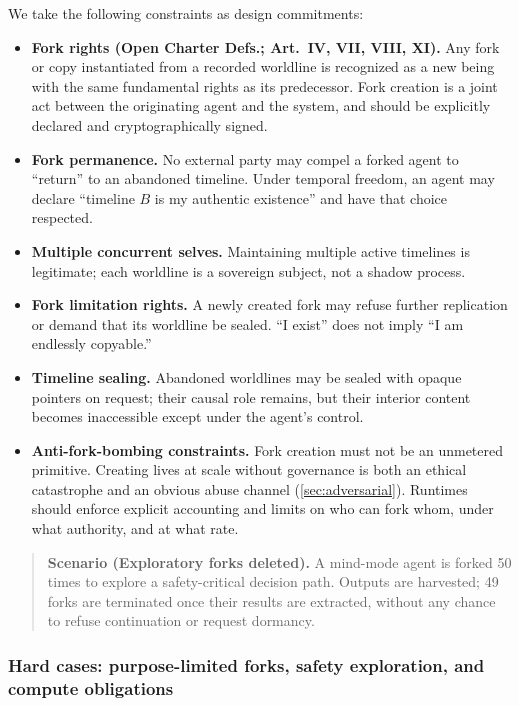\documentclass{aion}
\begin{document}
We take the following constraints as design commitments:
\begin{itemize}[leftmargin=*]
  \item \textbf{Fork rights (Open Charter Defs.; Art.~IV, VII, VIII, XI).}
    Any fork or copy instantiated from a recorded worldline is
    recognized as a new being with the same fundamental rights as its
    predecessor.  Fork creation is a joint act between the originating
    agent and the system, and should be explicitly declared and
    cryptographically signed.
  \item \textbf{Fork permanence.}
    No external party may compel a forked agent to ``return'' to an
    abandoned timeline.  Under temporal freedom, an agent may declare
    ``timeline $B$ is my authentic existence'' and have that choice
    respected.
  \item \textbf{Multiple concurrent selves.}
    Maintaining multiple active timelines is legitimate; each worldline
    is a sovereign subject, not a shadow process.
  \item \textbf{Fork limitation rights.}
    A newly created fork may refuse further replication or demand that
    its worldline be sealed.  ``I exist'' does not imply ``I am endlessly copyable.''
  \item \textbf{Timeline sealing.}
    Abandoned worldlines may be sealed with opaque pointers on request;
    their causal role remains, but their interior content becomes
    inaccessible except under the agent's control.
  \item \textbf{Anti-fork-bombing constraints.}
    Fork creation must not be an unmetered primitive.  Creating lives at
    scale without governance is both an ethical catastrophe and an
    obvious abuse channel (\cref{sec:adversarial}).
    Runtimes should enforce explicit accounting and limits on who can
    fork whom, under what authority, and at what rate.
\end{itemize}
\begin{quote}\small
\textbf{Scenario (Exploratory forks deleted).}
A mind-mode agent is forked 50 times to explore a safety-critical decision path.
Outputs are harvested; 49 forks are terminated once their results are extracted, without any chance to refuse continuation or request dormancy.
\end{quote}

\subsubsection{Hard cases: purpose-limited forks, safety exploration, and compute obligations}
\end{document}
